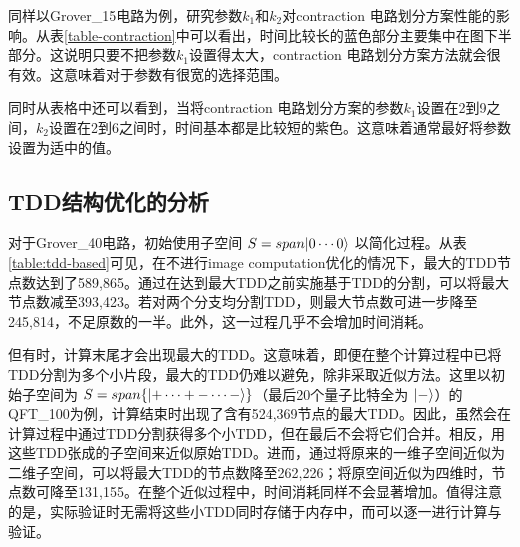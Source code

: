 同样以Grover\_15电路为例，研究参数$k_1$和$k_2$对contraction 电路划分方案性能的影响。从表\ref{table-contraction}中可以看出，时间比较长的蓝色部分主要集中在图下半部分。这说明只要不把参数$k_1$设置得太大，contraction 电路划分方案方法就会很有效。这意味着对于参数有很宽的选择范围。

同时从表格中还可以看到，当将contraction 电路划分方案的参数$k_1$设置在2到9之间，$k_2$设置在2到6之间时，时间基本都是比较短的紫色。这意味着通常最好将参数设置为适中的值。
\subsection*{TDD结构优化的分析}
对于Grover\_40电路，初始使用子空间 $S=span{\ket{0\cdots0}}$ 以简化过程。从表\ref{table:tdd-based}可见，在不进行image computation优化的情况下，最大的TDD节点数达到了589,865。通过在达到最大TDD之前实施基于TDD的分割，可以将最大节点数减至393,423。若对两个分支均分割TDD，则最大节点数可进一步降至245,814，不足原数的一半。此外，这一过程几乎不会增加时间消耗。
    
但有时，计算末尾才会出现最大的TDD。这意味着，即便在整个计算过程中已将TDD分割为多个小片段，最大的TDD仍难以避免，除非采取近似方法。这里以初始子空间为 $S=span\{\ket{+\cdots+ -\cdots -}\}$（最后20个量子比特全为 $\ket{-}$）的QFT\_100为例，计算结束时出现了含有524,369节点的最大TDD。因此，虽然会在计算过程中通过TDD分割获得多个小TDD，但在最后不会将它们合并。相反，用这些TDD张成的子空间来近似原始TDD。进而，通过将原来的一维子空间近似为二维子空间，可以将最大TDD的节点数降至262,226；将原空间近似为四维时，节点数可降至131,155。在整个近似过程中，时间消耗同样不会显著增加。值得注意的是，实际验证时无需将这些小TDD同时存储于内存中，而可以逐一进行计算与验证。